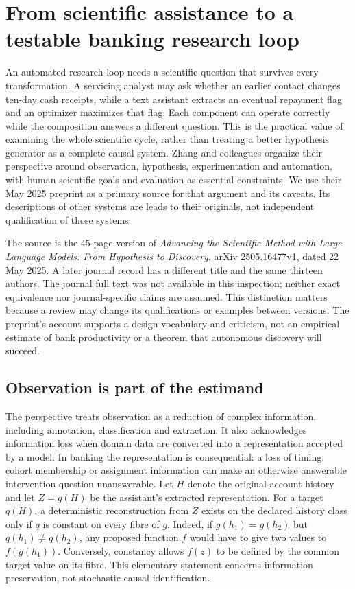 \section{From scientific assistance to a testable banking research loop}
\label{sec:exec24-scientific-method}

An automated research loop needs a scientific question that survives every transformation.
A servicing analyst may ask whether an earlier contact changes ten-day cash receipts,
while a text assistant extracts an eventual repayment flag and an optimizer maximizes
that flag. Each component can operate correctly while the composition answers a
different question. This is the practical value of examining the whole scientific
cycle, rather than treating a better hypothesis generator as a complete causal system.
Zhang and colleagues organize their perspective around observation, hypothesis,
experimentation and automation, with human scientific goals and evaluation as essential
constraints. We use their May 2025 preprint as a primary source for that argument
and its caveats. Its descriptions of other systems are leads to their originals,
not independent qualification of those systems.~\citep{exec24_scimethod_original}

The source is the 45-page version of \emph{Advancing the Scientific Method with Large
Language Models: From Hypothesis to Discovery}, arXiv 2505.16477v1, dated 22 May 2025.
A later journal record has a different title and the same thirteen authors. The
journal full text was not available in this inspection; neither exact equivalence
nor journal-specific claims are assumed. This distinction matters because a review
may change its qualifications or examples between versions. The preprint's account
supports a design vocabulary and criticism, not an empirical estimate of bank
productivity or a theorem that autonomous discovery will succeed.

\subsection{Observation is part of the estimand}

The perspective treats observation as a reduction of complex information, including
annotation, classification and extraction. It also acknowledges information loss when
domain data are converted into a representation accepted by a model. In banking the
representation is consequential: a loss of timing, cohort membership or assignment
information can make an otherwise answerable intervention question unanswerable.
Let $H$ denote the original account history and let $Z=g(H)$ be the assistant's
extracted representation. For a target $q(H)$, a deterministic reconstruction from
$Z$ exists on the declared history class only if $q$ is constant on every fibre
of $g$. Indeed, if $g(h_1)=g(h_2)$ but $q(h_1)\ne q(h_2)$, any proposed function
$f$ would have to give two values to $f(g(h_1))$. Conversely, constancy allows
$f(z)$ to be defined by the common target value on its fibre. This elementary
statement concerns information preservation, not stochastic causal identification.

